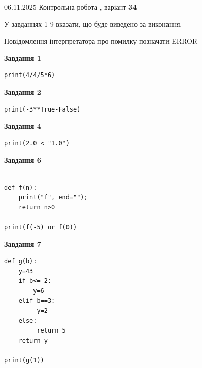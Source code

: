 \documentclass[12pt, ukrainian]{article}
\begin{document}
{\Large{06.11.2025 Контрольна робота , варіант  \No \textbf { 34 }\par}}
{
\begin {large}
У завданнях 1-9 вказати, що буде виведено за виконання.

Повідомлення інтерпретатора про помилку позначати ERROR

\begin{minipage}[t]{7.5cm}

\begin{center}
\textbf{Завдання 1}
\end{center}

\begin{verbatim}
print(4/4/5*6)
\end{verbatim}



\begin{center}
\textbf{Завдання 2}
\end{center}

\begin{verbatim}
print(-3**True-False)
\end{verbatim}



\begin{center}
\textbf{Завдання 4}
\end{center}

\begin{verbatim}
print(2.0 < "1.0")
\end{verbatim}



\begin{center}
\textbf{Завдання 6}
\end{center}

\begin{verbatim}

def f(n):
    print("f", end="");
    return n>0

print(f(-5) or f(0))
\end{verbatim}



\begin{center}
\textbf{Завдання 7}
\end{center}

\begin{verbatim}
def g(b):
    y=43
    if b<=-2: 
        y=6
    elif b==3:
         y=2
    else:
         return 5
    return y

print(g(1))
\end{verbatim}


\end{minipage}
\end{large}}
\end{document}
